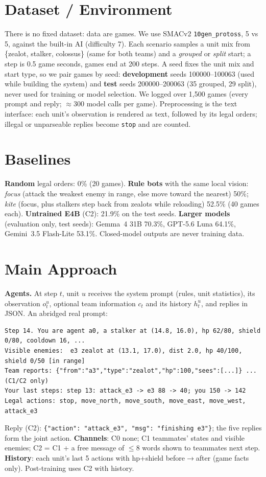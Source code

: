 \documentclass{article} %
\begin{document}
\section{Dataset / Environment}
There is no fixed dataset: data are games. We use SMACv2 \texttt{10gen\_protoss}, 5 vs 5, against the
built-in AI (difficulty 7). Each scenario samples a unit mix from \{zealot, stalker, colossus\} (same
for both teams) and a \emph{grouped} or \emph{split} start; a step is 0.5 game seconds, games end at
200 steps. A seed fixes the unit mix and start type, so we pair games by seed: \textbf{development}
seeds 100000--100063 (used while building the system) and \textbf{test} seeds 200000--200063 (35
grouped, 29 split), never used for training or model selection. We logged over 1{,}500 games (every
prompt and reply; $\approx$300 model calls per game). Preprocessing is the text interface: each unit's
observation is rendered as text, followed by its legal orders; illegal or unparseable replies become
\texttt{stop} and are counted.

\section{Baselines}
\textbf{Random} legal orders: 0\% (20 games). \textbf{Rule bots} with the same local vision:
\emph{focus} (attack the weakest enemy in range, else move toward the nearest) 50\%; \emph{kite}
(focus, plus stalkers step back from zealots while reloading) 52.5\% (40 games each).
\textbf{Untrained E4B} (C2): 21.9\% on the test seeds. \textbf{Larger models} (evaluation only, test
seeds): Gemma~4 31B 70.3\%, GPT-5.6 Luna 64.1\%, Gemini~3.5 Flash-Lite 53.1\%. Closed-model outputs are
never training data.

\section{Main Approach}
\textbf{Agents.} At step $t$, unit $u$ receives the system prompt (rules, unit statistics), its
observation $o_t^u$, optional team information $c_t$ and its history $h_t^u$, and replies in JSON. An
abridged real prompt:
{\scriptsize
\begin{verbatim}
Step 14. You are agent a0, a stalker at (14.8, 16.0), hp 62/80, shield 0/80, cooldown 16, ...
Visible enemies:  e3 zealot at (13.1, 17.0), dist 2.0, hp 40/100, shield 0/50 [in range]
Team reports: {"from":"a3","type":"zealot","hp":100,"sees":[...]} ...   (C1/C2 only)
Your last steps: step 13: attack_e3 -> e3 88 -> 40; you 150 -> 142
Legal actions: stop, move_north, move_south, move_east, move_west, attack_e3
\end{verbatim}}
\noindent Reply (C2): \texttt{\{"action": "attack\_e3", "msg": "finishing e3"\}}; the five replies form
the joint action. \textbf{Channels}: C0 none; C1 teammates' states and visible enemies; C2 = C1 + a free
message of $\le$8 words shown to teammates next step. \textbf{History}: each unit's last 5 actions with
hp+shield before$\to$after (game facts only). Post-training uses C2 with history.
\end{document}
